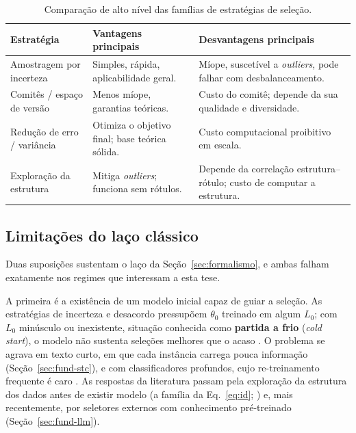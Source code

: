 \begin{table}[htbp]
\centering
\caption{Comparação de alto nível das famílias de estratégias de seleção.}
\label{tab:estrategias_comparacao_rev}
{\small
\begin{tabular}{@{}p{}p{}p{}@{}}
\toprule
\textbf{Estratégia}        & \textbf{Vantagens principais}                                           & \textbf{Desvantagens principais}                                             \\ \midrule
Amostragem por incerteza      & Simples, rápida, aplicabilidade geral.  & Míope, suscetível a \textit{outliers}, pode falhar com desbalanceamento.   \\
Comitês / espaço de versão  & Menos míope, garantias teóricas. & Custo do comitê; depende da sua qualidade e diversidade. \\
Redução de erro / variância & Otimiza o objetivo final; base teórica sólida.   & Custo computacional proibitivo em escala. \\
Exploração da estrutura  & Mitiga \textit{outliers}; funciona sem rótulos.          & Depende da correlação estrutura--rótulo; custo de computar a estrutura. \\ \bottomrule
\end{tabular}
}
\end{table}

\subsection{Limitações do laço clássico}
\label{sec:limitacoes_laco}

Duas suposições sustentam o laço da Seção~\ref{sec:formalismo}, e ambas
falham exatamente nos regimes que interessam a esta tese.

A primeira é a existência de um modelo inicial capaz de guiar a seleção. As
estratégias de incerteza e desacordo pressupõem $\theta_0$ treinado em algum
$L_0$; com $L_0$ minúsculo ou inexistente, situação conhecida como
\textbf{partida a frio} (\textit{cold start}), o modelo não sustenta seleções
melhores que o acaso
\cite{Bayer2024ActiveLLM}. O problema se agrava em texto curto, em que cada
instância carrega pouca informação (Seção~\ref{sec:fund-stc}), e com
classificadores profundos, cujo re-treinamento frequente é caro
\cite{Wertz2022}. As respostas da literatura passam pela exploração da estrutura dos dados antes
de existir modelo (a família da Eq.~\eqref{eq:id};
\citealp{Hacohen2022TypiClust}) e, mais recentemente, por seletores externos
com conhecimento pré-treinado \citep{Bayer2024ActiveLLM}
(Seção~\ref{sec:fund-llm}).


